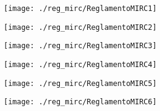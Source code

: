 \begin{figure}[!ht]
    \centering
    \texttt{[image: ./reg\_mirc/ReglamentoMIRC1]}
\end{figure}
\clearpage

\begin{figure}[!ht]
    \centering
    \texttt{[image: ./reg\_mirc/ReglamentoMIRC2]}
\end{figure}
\clearpage

\begin{figure}[!ht]
    \centering
    \texttt{[image: ./reg\_mirc/ReglamentoMIRC3]}
\end{figure}
\clearpage

\begin{figure}[!ht]
    \centering
    \texttt{[image: ./reg\_mirc/ReglamentoMIRC4]}
\end{figure}
\clearpage

\begin{figure}[!ht]
    \centering
    \texttt{[image: ./reg\_mirc/ReglamentoMIRC5]}
\end{figure}
\clearpage

\begin{figure}[!ht]
    \centering
    \texttt{[image: ./reg\_mirc/ReglamentoMIRC6]}
\end{figure}
\clearpage

